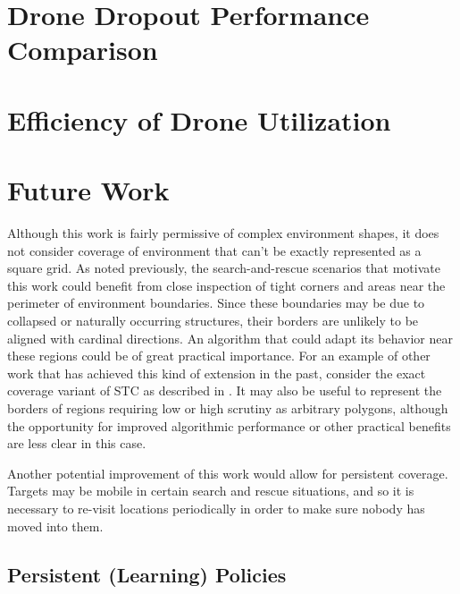 \section{Drone Dropout Performance Comparison}

\section{Efficiency of Drone Utilization}


\section{Future Work}

Although this work is fairly permissive of complex environment shapes, it does not consider coverage of environment that can't be exactly represented as a square grid. As noted previously, the search-and-rescue scenarios that motivate this work could benefit from close inspection of tight corners and areas near the perimeter of environment boundaries. Since these boundaries may be due to collapsed or naturally occurring structures, their borders are unlikely to be aligned with cardinal directions. An algorithm that could adapt its behavior near these regions could be of great practical importance. For an example of other work that has achieved this kind of extension in the past, consider the exact coverage variant of STC as described in \cite{STC}. It may also be useful to represent the borders of regions requiring low or high scrutiny as arbitrary polygons, although the opportunity for improved algorithmic performance or other practical benefits are less clear in this case.

Another potential improvement of this work would allow for persistent coverage. Targets may be mobile in certain search and rescue situations, and so it is necessary to re-visit locations periodically in order to make sure nobody has moved into them. %

\subsection{Persistent (Learning) Policies}


